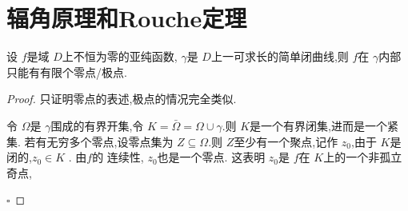 \documentclass[../../复变函数.tex]{subfiles}
\begin{document}
\section{辐角原理和Rouche定理}


\begin{lemma}
    设 \(  f  \)是域 \(  D  \)上不恒为零的亚纯函数, \(   \gamma   \)是 \(  D  \)上一可求长的简单闭曲线,则 \(  f  \)在 \(   \gamma   \)内部只能有有限个零点/极点.      
\end{lemma}
\begin{proof}
    只证明零点的表述,极点的情况完全类似.

    令 \(   \Omega   \)是 \(   \gamma   \)围成的有界开集,令 \(  K=  \bar{\Omega}=  \Omega \cup  \gamma   \).则 \(  K  \)是一个有界闭集,进而是一个紧集.   若有无穷多个零点,设零点集为 \(  Z  \subseteq  \Omega \).则 \(  Z  \)至少有一个聚点,记作 \(  z_0  \),由于 \(  K  \)是闭的,\(  z_0 \in K  \)  . 由\(  f  \)的 连续性, \(  z_0  \)也是一个零点. 这表明 \(  z_0  \)是 \(  f  \)在 \(  K  \)上的一个非孤立奇点,   

    \hfill $\square$
\end{proof}
\end{document}
